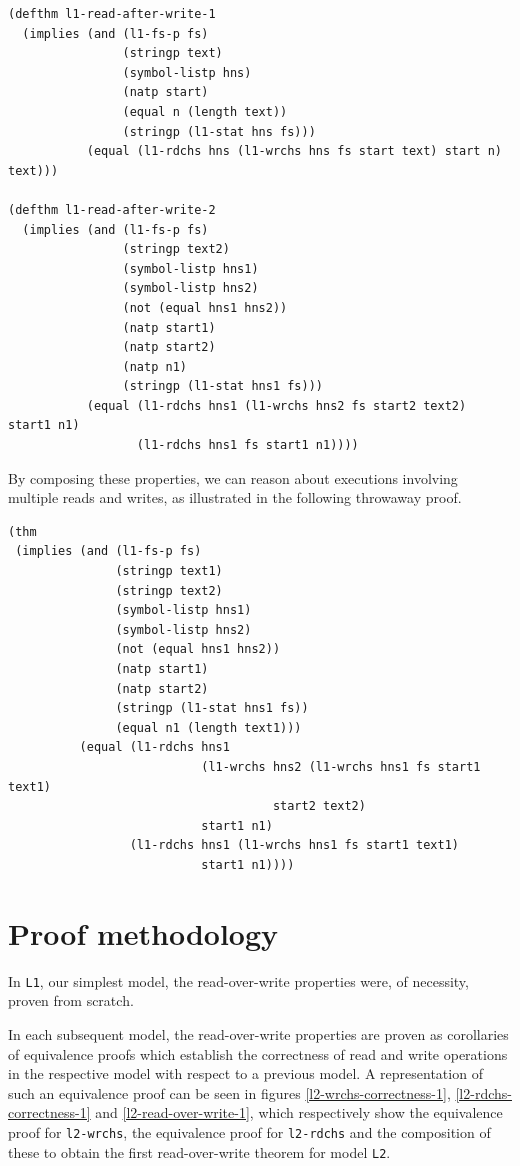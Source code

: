 \documentclass[submission,copyright,creativecommons]{eptcs}
\begin{document}
\medskip

\noindent
\begin{verbatim}
(defthm l1-read-after-write-1
  (implies (and (l1-fs-p fs)
                (stringp text)
                (symbol-listp hns)
                (natp start)
                (equal n (length text))
                (stringp (l1-stat hns fs)))
           (equal (l1-rdchs hns (l1-wrchs hns fs start text) start n) text)))

(defthm l1-read-after-write-2
  (implies (and (l1-fs-p fs)
                (stringp text2)
                (symbol-listp hns1)
                (symbol-listp hns2)
                (not (equal hns1 hns2))
                (natp start1)
                (natp start2)
                (natp n1)
                (stringp (l1-stat hns1 fs)))
           (equal (l1-rdchs hns1 (l1-wrchs hns2 fs start2 text2) start1 n1)
                  (l1-rdchs hns1 fs start1 n1))))
\end{verbatim}

By composing these properties, we can reason about executions
involving multiple reads and writes, as illustrated in the following
throwaway proof.

\medskip

\noindent
\begin{verbatim}
(thm
 (implies (and (l1-fs-p fs)
               (stringp text1)
               (stringp text2)
               (symbol-listp hns1)
               (symbol-listp hns2)
               (not (equal hns1 hns2))
               (natp start1)
               (natp start2)
               (stringp (l1-stat hns1 fs))
               (equal n1 (length text1)))
          (equal (l1-rdchs hns1
                           (l1-wrchs hns2 (l1-wrchs hns1 fs start1 text1)
                                     start2 text2)
                           start1 n1)
                 (l1-rdchs hns1 (l1-wrchs hns1 fs start1 text1)
                           start1 n1))))
\end{verbatim}

\section{Proof methodology}

In \texttt{L1}, our simplest model, the read-over-write properties
were, of necessity, proven from scratch.

In each subsequent model, the read-over-write properties are proven as
corollaries of equivalence proofs which establish the correctness of
read and write operations in the respective model with respect to a
previous model. A representation of such an equivalence proof can be
seen in figures \ref{l2-wrchs-correctness-1},
\ref{l2-rdchs-correctness-1} and \ref{l2-read-over-write-1}, which
respectively show the equivalence proof for \texttt{l2-wrchs}, the
equivalence proof for \texttt{l2-rdchs} and the composition of these
to obtain the first read-over-write theorem for model \texttt{L2}.
\end{document}
